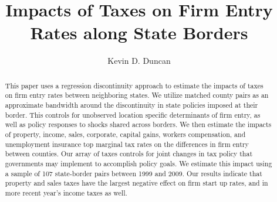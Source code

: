 \documentclass[12pt,a4paper]{article}
\renewcommand{\baselinestretch}{2}
\begin{document}
\title{Impacts of Taxes on Firm Entry Rates along State Borders}
\author{Kevin D. Duncan}
\date{}
\maketitle

\begin{abstract}
This paper uses a regression discontinuity approach to estimate the impacts of taxes on firm entry rates between neighboring states. We utilize matched county pairs as an approximate bandwidth around the discontinuity in state policies imposed at their border. This controls for unobserved location specific determinants of firm entry, as well as policy responses to shocks shared across borders. We then estimate the impacts of property, income, sales, corporate, capital gains, workers compensation, and unemployment insurance top marginal tax rates on the differences in firm entry between counties. Our array of taxes controls for joint changes in tax policy that governments may implement to accomplish policy goals. We estimate this impact using a sample of 107 state-border pairs between 1999 and 2009. Our results indicate that property and sales taxes have the largest negative effect on firm start up rates, and in more recent year's income taxes as well.
\end{abstract}

\newpage








\renewcommand{\baselinestretch}{1.0} 
\end{document}
